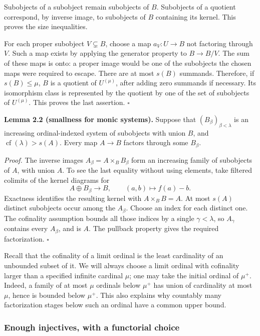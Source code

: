 \documentclass[
  english,
  11pt,
  a4paper,
]{article}
\begin{document}
Subobjects of a subobject remain subobjects of \(B\). Subobjects of a
quotient correspond, by inverse image, to subobjects of \(B\) containing
its kernel. This proves the size inequalities.

For each proper subobject \(V\subsetneq B\), choose a map \(a_V:U\to B\)
not factoring through \(V\). Such a map exists by applying the generator
property to \(B\to B/V\). The sum of these maps is onto: a proper image
would be one of the subobjects the chosen maps were required to escape.
There are at most \(s(B)\) summands. Therefore, if \(s(B)\leq\mu\),
\(B\) is a quotient of \(U^{(\mu)}\), after adding zero summands if
necessary. Its isomorphism class is represented by the quotient by one
of the set of subobjects of \(U^{(\mu)}\). This proves the last
assertion. \(\square\)

\textbf{Lemma 2.2 (smallness for monic systems).} Suppose that
\((B_\beta)_{\beta<\lambda}\) is an increasing ordinal-indexed system of
subobjects with union \(B\), and \(\operatorname{cf}(\lambda)>s(A)\).
Every map \(A\to B\) factors through some \(B_\beta\).

\emph{Proof.} The inverse images \(A_\beta=A\times_B B_\beta\) form an
increasing family of subobjects of \(A\), with union \(A\). To see the
last equality without using elements, take filtered colimits of the
kernel diagrams for
\[A\oplus B_\beta\longrightarrow B,\qquad (a,b)\longmapsto f(a)-b.\]
Exactness identifies the resulting kernel with \(A\times_B B=A\). At
most \(s(A)\) distinct subobjects occur among the \(A_\beta\). Choose an
index for each distinct one. The cofinality assumption bounds all those
indices by a single \(\gamma<\lambda\), so \(A_\gamma\) contains every
\(A_\beta\), and is \(A\). The pullback property gives the required
factorization. \(\square\)

Recall that the cofinality of a limit ordinal is the least cardinality
of an unbounded subset of it. We will always choose a limit ordinal with
cofinality larger than a specified infinite cardinal \(\mu\); one may
take the initial ordinal of \(\mu^+\). Indeed, a family of at most
\(\mu\) ordinals below \(\mu^+\) has union of cardinality at most
\(\mu\), hence is bounded below \(\mu^+\). This also explains why
countably many factorization stages below such an ordinal have a common
upper bound.

\subsubsection{Enough injectives, with a functorial
choice}\label{k-injective-resolutions-in-grothendieck-categories--enough-injectives-with-a-functorial-choice}
\end{document}
